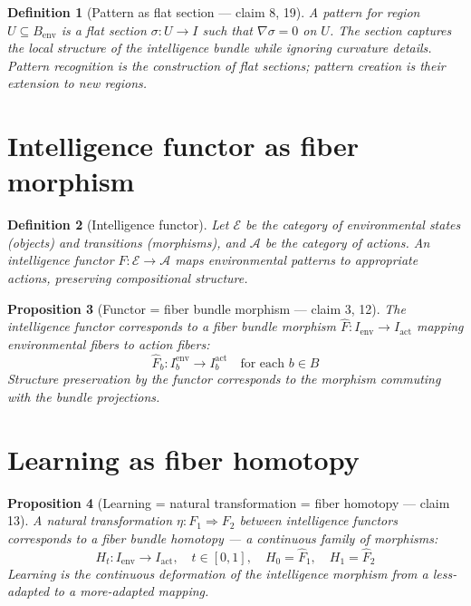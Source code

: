 \documentclass[11pt,a4paper]{article}
\newtheorem{definition}{Definition}[section]
\newtheorem{proposition}[definition]{Proposition}
\begin{document}
\begin{definition}[Pattern as flat section --- claim 8, 19]
A \emph{pattern} for region $U \subseteq B_{\text{env}}$ is a flat section
$\sigma : U \to I$ such that $\nabla \sigma = 0$ on $U$. The section
captures the local structure of the intelligence bundle while ignoring
curvature details. Pattern recognition is the construction of flat
sections; pattern creation is their extension to new regions.
\end{definition}

\section{Intelligence functor as fiber morphism}

\begin{definition}[Intelligence functor]
Let $\mathcal{E}$ be the category of environmental states (objects) and
transitions (morphisms), and $\mathcal{A}$ be the category of actions.
An \emph{intelligence functor} $F: \mathcal{E} \to \mathcal{A}$ maps
environmental patterns to appropriate actions, preserving compositional
structure.
\end{definition}

\begin{proposition}[Functor = fiber bundle morphism --- claim 3, 12]
\label{prop:functor}
The intelligence functor corresponds to a fiber bundle morphism
$\hat{F}: I_{\text{env}} \to I_{\text{act}}$ mapping environmental fibers
to action fibers:
\[
  \hat{F}_b : I_b^{\text{env}} \to I_b^{\text{act}}
  \quad \text{for each } b \in B
\]
Structure preservation by the functor corresponds to the morphism
commuting with the bundle projections.
\end{proposition}

\section{Learning as fiber homotopy}

\begin{proposition}[Learning = natural transformation = fiber homotopy --- claim 13]
\label{prop:learning}
A natural transformation $\eta: F_1 \Rightarrow F_2$ between intelligence
functors corresponds to a fiber bundle homotopy --- a continuous family of
morphisms:
\[
  H_t : I_{\text{env}} \to I_{\text{act}}, \quad t \in [0,1],
  \quad H_0 = \hat{F}_1, \quad H_1 = \hat{F}_2
\]
Learning is the continuous deformation of the intelligence morphism from
a less-adapted to a more-adapted mapping.
\end{proposition}
\end{document}
